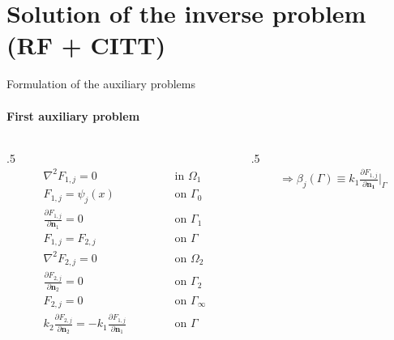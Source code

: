 \documentclass{beamer}
\begin{document}
\section{Solution of the inverse problem (RF + CITT)}
\begin{frame}{Formulation of the auxiliary problems}
	\framesubtitle{First auxiliary problem}
	\begin{columns}
	\begin{column}{.5\textwidth}
	\begin{subequations}
		\begin{alignat*}{2}
		& \nabla^2 F_{1,j} = 0 \quad\quad\quad\quad && \text{ in } \Omega_1  \\
		& F_{1,j} = \psi_j(x) && \text{ on } \Gamma_0   \\
		& \frac{\partial F_{1,j}}{\partial \mathbf{n}_1} = 0 && \text{ on }  \Gamma_1  \\ 
		& F_{1,j} = F_{2, j} \quad\quad\quad\quad\quad && \text{ on }  \Gamma \\
		& \nabla^2 F_{2,j} = 0 && \text{ on }  \Omega_2 \\
		& \frac{\partial F_{2,j}}{\partial \mathbf{n}_2} = 0 && \text{ on }  \Gamma_2 \\
		& F_{2,j} = 0 && \text{ on }  \Gamma_\infty \\
		& k_2\frac{\partial F_{2, j}}{\partial\mathbf{n}_2} = - k_1\frac{\partial F_{1,j}}{\partial\mathbf{n}_1} && \text{ on }  \Gamma 
		\end{alignat*}
	\end{subequations}
	\end{column}
	
	\begin{column}{.5\textwidth}
		\begin{align*}
		\Rightarrow \beta_j(\Gamma) \equiv k_1 \frac{\partial F_{1,j}}{\partial\mathbf{n_1}}\bigg|_\Gamma
		\end{align*}
	\end{column}
	\end{columns}
	
	\begin{center}
	\end{center}
\end{frame}
\end{document}
